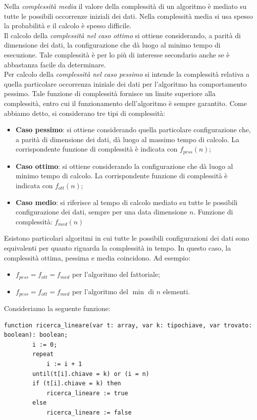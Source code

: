 \documentclass[12pt]{report}
\begin{document}
   	Nella \textit{complessità media} il valore della complessità di un algoritmo è mediato su tutte le possibili occorrenze iniziali dei dati. Nella complessità media si usa spesso la probabilità e il calcolo è spesso difficile. \\
   	Il calcolo della \textit{complessità nel caso ottimo} si ottiene considerando, a parità di dimensione dei dati, la configurazione che dà luogo al minimo tempo di esecuzione. Tale complessità è per lo più di interesse secondario anche se è abbastanza facile da determinare. \\
   	Per calcolo della  \textit{complessità nel caso pessimo} si intende la complessità relativa a quella particolare occorrenza iniziale dei dati per l'algoritmo ha comportamento pessimo. Tale funzione di complessità fornisce un limite superiore alla complessità, entro cui il funzionamento dell'algoritmo è sempre garantito.
   	Come abbiamo detto, si considerano tre tipi di complessità:
   	\begin{itemize}
   		\item \textbf{Caso pessimo}: si ottiene considerando quella particolare configurazione che, a parità di dimensione dei dati, dà luogo al massimo tempo di calcolo. La corrispondente funzione di complessità è indicata con $f_{pess}(n)$;
   		\item \textbf{Caso ottimo}: si ottiene considerando la configurazione che dà luogo al minimo tempo di calcolo. La corrispondente funzione di complessità è indicata con $f_{ott}(n)$;
   		\item \textbf{Caso medio}: si riferisce al tempo di calcolo mediato su tutte le possibili configurazione dei dati, sempre per una data dimensione $n$. Funzione di complessità: $f_{med}(n)$
   	\end{itemize}
   	Esistono particolari algoritmi in cui tutte le possibili configurazioni dei dati sono equivalenti per quanto riguarda la complessità in tempo. In questo caso, la complessità ottima, pessima e media coincidono. Ad esempio:
   	\begin{itemize}
   		\item $f_{pess} = f_{ott} = f_{med}$ per l'algoritmo del fattoriale;
   		\item $f_{pess} = f_{ott} = f_{med}$ per l'algoritmo del $\min$ di $n$ elementi.
   	\end{itemize}
   	Consideriamo la seguente funzione:
   	\begin{lstlisting}[style=pascalstyle]
   		function ricerca_lineare(var t: array, var k: tipochiave, var trovato: boolean): boolean;
   		i := 0;
   		repeat
   			i := i + 1
   		until(t[i].chiave = k) or (i = n)
   		if (t[i].chiave = k) then
   			ricerca_lineare := true
   		else
   			ricerca_lineare := false
   	\end{lstlisting}
\end{document}
